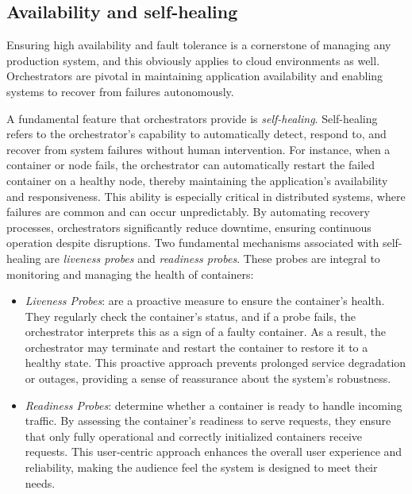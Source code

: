 \subsection{Availability and self-healing}\label{subsec:chpt1-availability}

Ensuring high availability and fault tolerance is a cornerstone of managing any
production system, and this obviously applies to cloud environments as well.
Orchestrators are pivotal in maintaining application availability and enabling
systems to recover from failures autonomously.

A fundamental feature that orchestrators provide is \textit{self-healing}.
Self-healing refers to the orchestrator's capability to automatically detect,
respond to, and recover from system failures without human intervention.
For instance, when a container or node fails, the orchestrator can automatically
restart the failed container on a healthy node, thereby maintaining the
application's availability and responsiveness.
This ability is especially critical in distributed systems, where failures are
common and can occur unpredictably.
By automating recovery processes, orchestrators significantly reduce downtime,
ensuring continuous operation despite disruptions.
Two fundamental mechanisms associated with self-healing are \textit{liveness
  probes} and \textit{readiness probes}. These probes are integral to monitoring
and managing the health of containers:

\begin{itemize}
  \itemsep0em
   \item \textit{Liveness Probes}: are a proactive measure to ensure the
     container's health.
     They regularly check the container's status, and if a probe fails, the
     orchestrator interprets this as a sign of a faulty container.
     As a result, the orchestrator may terminate and restart the container to
     restore it to a healthy state. This proactive approach prevents prolonged
     service degradation or outages, providing a sense of reassurance about the
     system's robustness.
    \item \textit{Readiness Probes}: determine whether a container is ready to
      handle incoming traffic.
      By assessing the container's readiness to serve requests, they ensure that
      only fully operational and correctly initialized containers receive requests.
      This user-centric approach enhances the overall user experience and
      reliability, making the audience feel the system is designed to meet their
      needs.
\end{itemize}

